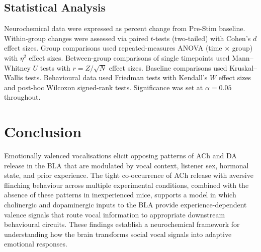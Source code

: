 \documentclass[11pt]{article}
\begin{document}
\subsection{Statistical Analysis}
Neurochemical data were expressed as percent change from Pre-Stim baseline. Within-group changes were assessed via paired $t$-tests (two-tailed) with Cohen's $d$ effect sizes. Group comparisons used repeated-measures ANOVA (time $\times$ group) with $\eta^2$ effect sizes. Between-group comparisons of single timepoints used Mann--Whitney $U$ tests with $r = Z/\sqrt{N}$ effect sizes. Baseline comparisons used Kruskal--Wallis tests. Behavioural data used Friedman tests with Kendall's $W$ effect sizes and post-hoc Wilcoxon signed-rank tests. Significance was set at $\alpha = 0.05$ throughout.

\section{Conclusion}

Emotionally valenced vocalisations elicit opposing patterns of ACh and DA release in the BLA that are modulated by vocal context, listener sex, hormonal state, and prior experience. The tight co-occurrence of ACh release with aversive flinching behaviour across multiple experimental conditions, combined with the absence of these patterns in inexperienced mice, supports a model in which cholinergic and dopaminergic inputs to the BLA provide experience-dependent valence signals that route vocal information to appropriate downstream behavioural circuits. These findings establish a neurochemical framework for understanding how the brain transforms social vocal signals into adaptive emotional responses.



\end{document}
